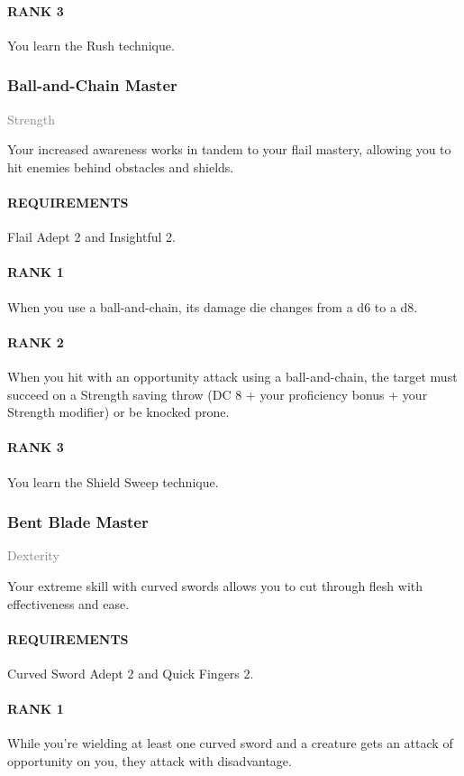\paragraph{RANK 3} You learn the Rush technique.

\subsubsection{Ball-and-Chain Master} \label{tal::ballandchainmaster}
\small{\textcolor{gray}{Strength}}

\normalsize
Your increased awareness works in tandem to your flail mastery, allowing you to hit enemies behind obstacles and shields.
\paragraph{REQUIREMENTS} Flail Adept 2 and Insightful 2.
\paragraph{RANK 1} When you use a ball-and-chain, its damage die changes from a d6 to a d8.
\paragraph{RANK 2} When you hit with an opportunity attack using a ball-and-chain, the target must succeed on a Strength saving throw (DC 8 + your proficiency bonus + your Strength modifier) or be knocked prone.
\paragraph{RANK 3} You learn the Shield Sweep technique.

\subsubsection{Bent Blade Master} \label{tal::bentblademaster}
\small{\textcolor{gray}{Dexterity}}

\normalsize
Your extreme skill with curved swords allows you to cut through flesh with effectiveness and ease.
\paragraph{REQUIREMENTS} Curved Sword Adept 2 and Quick Fingers 2.
\paragraph{RANK 1} While you're wielding at least one curved sword and a creature gets an attack of opportunity on you, they attack with disadvantage.
